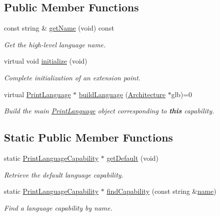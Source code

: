 \subsection*{Public Member Functions}
\begin{DoxyCompactItemize}
\item 
const string \& \mbox{\hyperlink{class_print_language_capability_abca4d334109a9e47968240cccbf72236}{get\+Name}} (void) const
\begin{DoxyCompactList}\small\item\em Get the high-\/level language name. \end{DoxyCompactList}\item 
virtual void \mbox{\hyperlink{class_print_language_capability_ac0c50c753c0e5b11a97ce789f18d33c7}{initialize}} (void)
\begin{DoxyCompactList}\small\item\em Complete initialization of an extension point. \end{DoxyCompactList}\item 
virtual \mbox{\hyperlink{class_print_language}{Print\+Language}} $\ast$ \mbox{\hyperlink{class_print_language_capability_a50e2abb3f0b4cf3ab67556f77eacc51e}{build\+Language}} (\mbox{\hyperlink{class_architecture}{Architecture}} $\ast$glb)=0
\begin{DoxyCompactList}\small\item\em Build the main \mbox{\hyperlink{class_print_language}{Print\+Language}} object corresponding to {\bfseries{this}} capability. \end{DoxyCompactList}\end{DoxyCompactItemize}
\subsection*{Static Public Member Functions}
\begin{DoxyCompactItemize}
\item 
static \mbox{\hyperlink{class_print_language_capability}{Print\+Language\+Capability}} $\ast$ \mbox{\hyperlink{class_print_language_capability_a2902f4f1ca2e24f215dcd431dbedc310}{get\+Default}} (void)
\begin{DoxyCompactList}\small\item\em Retrieve the default language capability. \end{DoxyCompactList}\item 
static \mbox{\hyperlink{class_print_language_capability}{Print\+Language\+Capability}} $\ast$ \mbox{\hyperlink{class_print_language_capability_a5feea559122bb1d976707540eb4b32ff}{find\+Capability}} (const string \&\mbox{\hyperlink{class_print_language_capability_ac286f0481d6c9ebfcf2cd497cc786e8b}{name}})
\begin{DoxyCompactList}\small\item\em Find a language capability by name. \end{DoxyCompactList}\end{DoxyCompactItemize}
